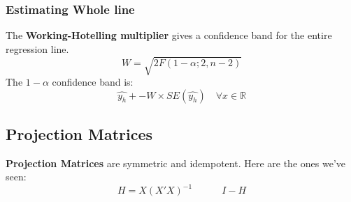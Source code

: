 \documentclass[12pt]{article}
\begin{document}
\subsubsection{Estimating Whole line}
The \textbf{Working-Hotelling multiplier} gives a confidence band for the
entire regression line.
\[
    W = \sqrt{2F(1 - \alpha;2, n-2)}
\]
The $1 - \alpha$ confidence band is:
\[
    \hat{y_h} +- W \times SE(\hat{y_h}) \quad \forall x \in \mathbb{R}
\]

\subsection{Projection Matrices}
\textbf{Projection Matrices} are symmetric and idempotent. Here are the
ones we've seen:
\[
    H = X(X'X)^{-1} \quad \quad \quad I - H
\]
\end{document}
